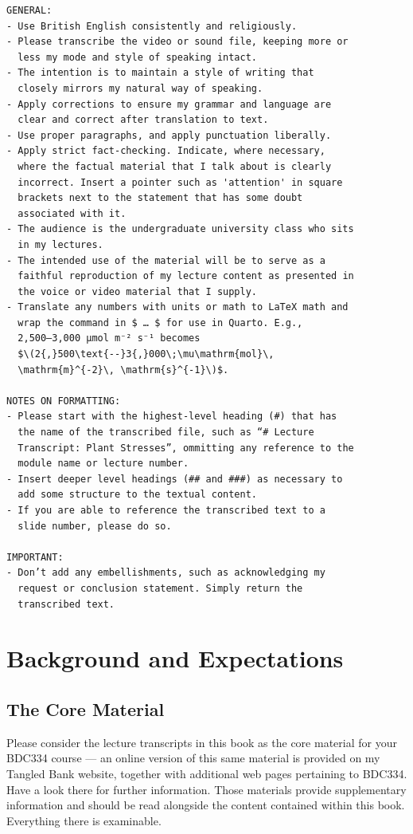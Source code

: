 \documentclass[
  10pt,
]{book}
\begin{document}
\begin{verbatim}
GENERAL:
- Use British English consistently and religiously.
- Please transcribe the video or sound file, keeping more or
  less my mode and style of speaking intact. 
- The intention is to maintain a style of writing that
  closely mirrors my natural way of speaking.
- Apply corrections to ensure my grammar and language are
  clear and correct after translation to text. 
- Use proper paragraphs, and apply punctuation liberally.
- Apply strict fact-checking. Indicate, where necessary,
  where the factual material that I talk about is clearly
  incorrect. Insert a pointer such as 'attention' in square
  brackets next to the statement that has some doubt
  associated with it.
- The audience is the undergraduate university class who sits
  in my lectures. 
- The intended use of the material will be to serve as a
  faithful reproduction of my lecture content as presented in
  the voice or video material that I supply.
- Translate any numbers with units or math to LaTeX math and
  wrap the command in $ … $ for use in Quarto. E.g.,
  2,500–3,000 μmol m⁻² s⁻¹ becomes
  $\(2{,}500\text{--}3{,}000\;\mu\mathrm{mol}\,
  \mathrm{m}^{-2}\, \mathrm{s}^{-1}\)$.

NOTES ON FORMATTING:
- Please start with the highest-level heading (#) that has
  the name of the transcribed file, such as “# Lecture
  Transcript: Plant Stresses”, ommitting any reference to the
  module name or lecture number.
- Insert deeper level headings (## and ###) as necessary to
  add some structure to the textual content. 
- If you are able to reference the transcribed text to a
  slide number, please do so.
 
IMPORTANT:
- Don’t add any embellishments, such as acknowledging my
  request or conclusion statement. Simply return the
  transcribed text.
\end{verbatim}

\chapter{Background and Expectations}\label{background-and-expectations}

\section{The Core Material}\label{the-core-material}

Please consider the lecture transcripts in this book as the core
material for your BDC334 course --- an online version of this same
material is provided on my Tangled Bank website, together with
additional web pages pertaining to BDC334. Have a look there for further
information. Those materials provide supplementary information and
should be read alongside the content contained within this book.
Everything there is examinable.
\end{document}
